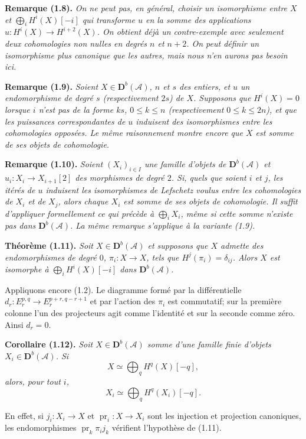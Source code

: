 \documentclass[11pt]{article}
\newcommand{\bD}{\mathbf D}
\newcommand{\cA}{\mathcal A}
\newenvironment{named}[1]{\par\medskip\noindent\textbf{#1}\itshape}{\par\medskip}
\begin{document}
\begin{named}{Remarque (1.8).}
On ne peut pas, en général, choisir un isomorphisme entre $X$ et $\bigoplus_iH^i(X)[-i]$ qui transforme $u$ en la somme des applications $u:H^i(X)\to H^{i+2}(X)$. On obtient déjà un contre-exemple avec seulement deux cohomologies non nulles en degrés $n$ et $n+2$. On peut définir un isomorphisme plus canonique que les autres, mais nous n'en aurons pas besoin ici.
\end{named}

\begin{named}{Remarque (1.9).}
Soient $X\in\bD^b(\cA)$, $n$ et $s$ des entiers, et $u$ un endomorphisme de degré $s$ (respectivement $2s$) de $X$. Supposons que $H^i(X)=0$ lorsque $i$ n'est pas de la forme $ks$, $0\le k\le n$ (respectivement $0\le k\le2n$), et que les puissances correspondantes de $u$ induisent des isomorphismes entre les cohomologies opposées. Le même raisonnement montre encore que $X$ est somme de ses objets de cohomologie.
\end{named}

\begin{named}{Remarque (1.10).}
Soient $(X_i)_{i\in I}$ une famille d'objets de $\bD^b(\cA)$ et $u_i:X_i\to X_{i+1}[2]$ des morphismes de degré $2$. Si, quels que soient $i$ et $j$, les itérés de $u$ induisent les isomorphismes de Lefschetz voulus entre les cohomologies de $X_i$ et de $X_j$, alors chaque $X_i$ est somme de ses objets de cohomologie. Il suffit d'appliquer formellement ce qui précède à $\bigoplus_iX_i$, même si cette somme n'existe pas dans $\bD^b(\cA)$. La même remarque s'applique à la variante (1.9).
\end{named}

\begin{named}{Théorème (1.11).}
Soit $X\in\bD^b(\cA)$ et supposons que $X$ admette des endomorphismes de degré $0$, $\pi_i:X\to X$, tels que $H^j(\pi_i)=\delta_{ij}$. Alors $X$ est isomorphe à $\bigoplus_iH^i(X)[-i]$ dans $\bD^b(\cA)$.
\end{named}
Appliquons encore (1.2). Le diagramme formé par la différentielle $d_r:E_r^{p,q}\to E_r^{p+r,q-r+1}$ et par l'action des $\pi_i$ est commutatif; sur la première colonne l'un des projecteurs agit comme l'identité et sur la seconde comme zéro. Ainsi $d_r=0$.

\begin{named}{Corollaire (1.12).}
Soit $X\in\bD^b(\cA)$ somme d'une famille finie d'objets $X_i\in\bD^b(\cA)$. Si
\[
X\simeq\bigoplus_q H^q(X)[-q],
\]
alors, pour tout $i$,
\[
X_i\simeq\bigoplus_q H^q(X_i)[-q].
\]
\end{named}
En effet, si $j_i:X_i\to X$ et $\operatorname{pr}_i:X\to X_i$ sont les injection et projection canoniques, les endomorphismes $\operatorname{pr}_k\pi_i j_k$ vérifient l'hypothèse de (1.11).
\end{document}
